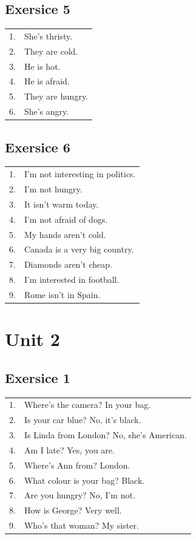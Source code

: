 \documentclass[9pt, oneside]{article}
\begin{document}
\subsection{Exersice 5}
\begin{tabular}{l l}
1. & She's thristy.\\
2. & They are cold.\\
3. & He is hot.\\
4. & He is afraid.\\
5. & They are hungry.\\
6. & She's angry.\\
\end{tabular}

\subsection{Exersice 6}
\begin{tabular}{l l}
1. & I'm not interesting in politics.\\
2. & I'm not hungry.\\
3. & It isn't warm today.\\
4. & I'm not afraid of dogs.\\
5. & My hands aren't cold.\\
6. & Canada is a very big country.\\
7. & Diamonds aren't cheap.\\
8. & I'm interested in football.\\
9. & Rome isn't in Spain.\\
\end{tabular}

\section{Unit 2}
\subsection{Exersice 1}
\begin{tabular}{l l}
1. & Where's the camera? In your bag.\\
2. & Is your car blue? No, it's black.\\
3. & Is Linda from London? No, she's American.\\
4. & Am I late? Yes, you are.\\
5. & Where's Ann from? London.\\
6. & What colour is your bag? Black.\\
7. & Are you hungry? No, I'm not.\\
8. & How is George? Very well.\\
9. & Who's that woman? My sister.\\
\end{tabular}
\end{document}
